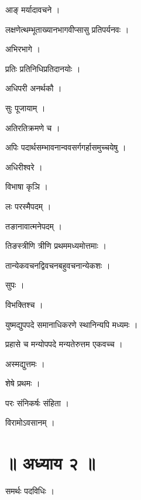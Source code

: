 \documentclass[10pt, openany]{book}
\begin{document}
\noindent आङ् मर्यादावचने ।

\noindent लक्षणेत्थम्भूताख्यानभागवीप्सासु प्रतिपर्यनवः ।

\noindent अभिरभागे ।

\noindent प्रतिः प्रतिनिधिप्रतिदानयोः ।

\noindent अधिपरी अनर्थकौ ।

\noindent सुः पूजायाम् ।

\noindent अतिरतिक्रमणे च ।

\noindent अपिः पदार्थसम्भावनान्ववसर्गगर्हासमुच्चयेषु ।

\noindent अधिरीश्वरे ।

\noindent विभाषा कृञि ।

\noindent लः परस्मैपदम् ।

\noindent तङानावात्मनेपदम् ।

\noindent तिङस्त्रीणि त्रीणि प्रथममध्यमोत्तमाः ।

\noindent तान्येकवचनद्विवचनबहुवचनान्येकशः ।

\noindent सुपः ।

\noindent विभक्तिश्च ।

\noindent युष्मद्युपपदे समानाधिकरणे स्थानिन्यपि मध्यमः ।

\noindent प्रहासे च मन्योपपदे मन्यतेरुत्तम एकवच्च ।

\noindent अस्मद्युत्तमः ।

\noindent शेषे प्रथमः ।

\noindent परः संनिकर्षः संहिता ।

\noindent विरामोऽवसानम् ।

\section*{॥ अध्याय २ ॥}

\noindent समर्थः पदविधिः ।
\end{document}
